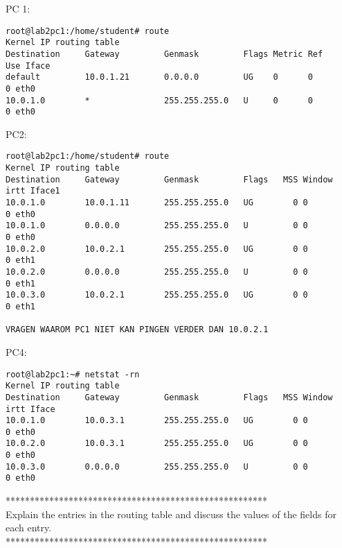 \newpage
PC 1:
\begin{lstlisting}
root@lab2pc1:/home/student# route
Kernel IP routing table
Destination     Gateway         Genmask         Flags Metric Ref    Use Iface
default         10.0.1.21       0.0.0.0         UG    0      0        0 eth0
10.0.1.0        *               255.255.255.0   U     0      0        0 eth0
\end{lstlisting}

PC2:
\begin{lstlisting}
root@lab2pc1:/home/student# route
Kernel IP routing table
Destination     Gateway         Genmask         Flags   MSS Window  irtt Iface1
10.0.1.0        10.0.1.11       255.255.255.0   UG        0 0          0 eth0
10.0.1.0        0.0.0.0         255.255.255.0   U         0 0          0 eth0
10.0.2.0        10.0.2.1        255.255.255.0   UG        0 0          0 eth1
10.0.2.0        0.0.0.0         255.255.255.0   U         0 0          0 eth1
10.0.3.0        10.0.2.1        255.255.255.0   UG        0 0          0 eth1

VRAGEN WAAROM PC1 NIET KAN PINGEN VERDER DAN 10.0.2.1
\end{lstlisting}

PC4:
\begin{lstlisting}
root@lab2pc1:~# netstat -rn
Kernel IP routing table
Destination     Gateway         Genmask         Flags   MSS Window  irtt Iface
10.0.1.0        10.0.3.1        255.255.255.0   UG        0 0          0 eth0
10.0.2.0        10.0.3.1        255.255.255.0   UG        0 0          0 eth0
10.0.3.0        0.0.0.0         255.255.255.0   U         0 0          0 eth0
\end{lstlisting}


****************************************************** \\
Explain the entries in the routing table and discuss the values of the fields for each entry. \\
******************************************************

